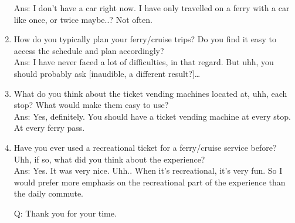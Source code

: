 \begin{enumerate}
Ans: I don’t have a car right now. I have only travelled on a ferry with a car like once, or twice maybe..? Not often.
    \item How do you typically plan your ferry/cruise trips? Do you find it easy to access the schedule and plan accordingly?\\
Ans: I have never faced a lot of difficulties, in that regard. But uhh, you should probably ask [inaudible, a different result?]…
    \item What do you think about the ticket vending machines located at, uhh, each stop? What would make them easy to use?\\
Ans: Yes, definitely. You should have a ticket vending machine at every stop. At every ferry pass.
    \item Have you ever used a recreational ticket for a ferry/cruise service before? Uhh, if so, what did you think about the experience?\\
Ans: Yes. It was very nice. Uhh.. When it’s recreational, it’s very fun. So I would prefer more emphasis on the recreational part of the experience than the daily commute.

Q: Thank you for your time.
\end{enumerate}